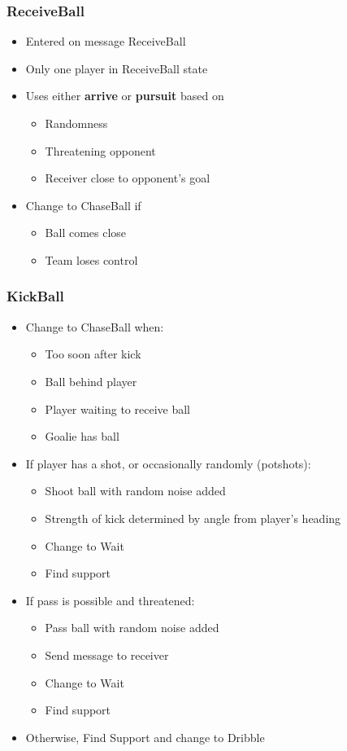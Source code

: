 \documentclass[handout,t,compress]{beamer}
\newcommand{\bframe}[1]{\begin{frame}[fragile]\frametitle{{#1}}}
\begin{document}
\bframe{ReceiveBall}
\begin{itemize}
\item Entered on message ReceiveBall
\item Only one player in ReceiveBall state
\item Uses either {\bf arrive} or {\bf pursuit} based on
\begin{itemize}
\item Randomness
\item Threatening opponent
\item Receiver close to opponent's goal
\end{itemize}
\item Change to ChaseBall if
\begin{itemize}
\item Ball comes close
\item Team loses control
\end{itemize}
\end{itemize}
\end{frame}

\bframe{KickBall}
\begin{itemize}
\item Change to ChaseBall when:
\begin{itemize}
\item Too soon after kick
\item Ball behind player
\item Player waiting to receive ball
\item Goalie has ball
\end{itemize}
\item If player has a shot, or occasionally randomly (potshots):
\begin{itemize}
\item Shoot ball with random noise added
\item Strength of kick determined by angle from player's heading
\item Change to Wait
\item Find support
\end{itemize}
\item If pass is possible and threatened:
\begin{itemize}
\item Pass ball with random noise added
\item Send message to receiver
\item Change to Wait
\item Find support
\end{itemize}
\item Otherwise, Find Support and change to Dribble
\end{itemize}
\end{frame}
\end{document}
